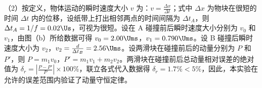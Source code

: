 \documentclass[\gkver]{gaokaozhenti}
\begin{document}
\begin{enumerate}
{（2）按定义，物体运动的瞬时速度大小 $v$ 为：$v=\frac{\Delta x}{\Delta t}$；式中 $\Delta x$ 为物块在很短的时间 $\Delta t$ 内的位移，设纸带上打出相邻两点的时间间隔为 $\Delta t_{A}$，则 $\Delta t_{A}=1/f=0.02\Us$，可视为很短。设在 A 碰撞前后瞬时速度大小分别为 $v_{0}$ 和 $v_{1}$，由图（b）所给数据可得 $v_{0}=2.00\Ums$，$v_{1}=0.790\Ums$。设 B 碰撞后瞬时速度大小为 $v_{2}$，$v_{2}=\frac{d}{\Delta t_{B}}=2.56\Ums$。设两滑块在碰撞前后的动量分别为 $P$ 和 $P'$，则 $P=m_{1}v_{0}$，$P'=m_{1}v_{1}+m_{2}v_{2}$。两滑块在碰撞前后总动量相对误差的绝对值为 $\delta_{r}=\left|\frac{P-P'}{P}\right|\times100\%$，联立各式代入数据得 $\delta_{r}=1.7\%<5\%$，因此，本实验在允许的误差范围内验证了动量守恒定律。
}

\end{enumerate}
\end{document}
